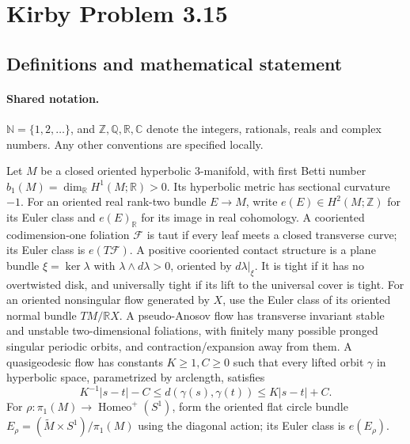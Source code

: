 \documentclass[11pt]{article}
\begin{document}
\section{Kirby Problem 3.15}\label{statement}

\subsection{Definitions and mathematical statement}

\paragraph{Shared notation.}$\mathbb N=\{1,2,\ldots\}$, and $\mathbb Z,\mathbb Q,\mathbb R,\mathbb C$ denote the integers, rationals, reals and complex numbers. Any other conventions are specified locally.


Let $M$ be a closed oriented hyperbolic $3$-manifold, with first Betti number $b_1(M)=\dim_{\mathbb R}H^1(M;\mathbb R)>0$. Its hyperbolic metric has sectional curvature $-1$. For an oriented real rank-two bundle $E\to M$, write $e(E)\in H^2(M;\mathbb Z)$ for its Euler class and $e(E)_{\mathbb R}$ for its image in real cohomology.
A cooriented codimension-one foliation $\mathcal F$ is taut if every leaf meets a closed transverse curve; its Euler class is $e(T\mathcal F)$. A positive cooriented contact structure is a plane bundle $\xi=\ker\lambda$ with $\lambda\wedge d\lambda>0$, oriented by $d\lambda|_\xi$. It is tight if it has no overtwisted disk, and universally tight if its lift to the universal cover is tight. For an oriented nonsingular flow generated by $X$, use the Euler class of its oriented normal bundle $TM/\mathbb RX$. A pseudo-Anosov flow has transverse invariant stable and unstable two-dimensional foliations, with finitely many possible pronged singular periodic orbits, and contraction/expansion away from them. A quasigeodesic flow has constants $K\ge1,C\ge0$ such that every lifted orbit $\gamma$ in hyperbolic space, parametrized by arclength, satisfies
\[
 K^{-1}|s-t|-C\le d(\gamma(s),\gamma(t))\le K|s-t|+C.
\]
For $\rho:\pi_1(M)\to\operatorname{Homeo}^+(S^1)$, form the oriented flat circle bundle $E_\rho=(\widetilde M\times S^1)/\pi_1(M)$ using the diagonal action; its Euler class is $e(E_\rho)$.
\end{document}
